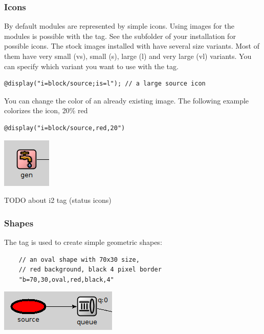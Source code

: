 \subsubsection{Icons}
By default modules are represented by simple icons.
Using images for the modules is possible with the  tag.
See the  subfolder of your {\opp} installation for possible
icons. The stock images installed with {\opp} have several size variants.
Most of them have very small (vs), small (s), large (l) and
very large (vl) variants. You can specify which variant you want to use with
the  tag.
\begin{verbatim}
@display("i=block/source;is=l"); // a large source icon
\end{verbatim}

You can change the color of an already existing image.
The following example colorizes the  icon, 20\% red
\begin{verbatim}
@display("i=block/source,red,20")
\end{verbatim}

\begin{center}
\includegraphics{figures/graphics-itag}
\end{center}

TODO about i2 tag (status icons)

\subsubsection{Shapes}
The  tag is used to create simple geometric shapes:
\begin{verbatim}
    // an oval shape with 70x30 size,
    // red background, black 4 pixel border
    "b=70,30,oval,red,black,4"
\end{verbatim}

\begin{center}
\includegraphics{figures/graphics-btag}
\end{center}

